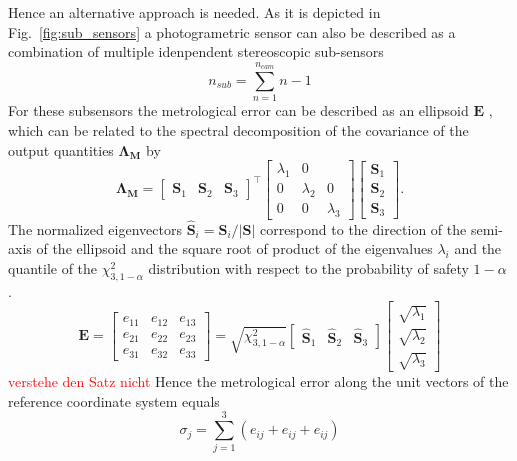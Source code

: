 \documentclass[5p,times,procedia]{elsarticle}
\begin{document}
Hence an alternative approach is needed. As it is depicted in  Fig.~\ref{fig:sub_sensors} a photogrametric sensor can also be described as a combination of multiple idenpendent stereoscopic sub-sensors
\begin{equation}
	\label{eqn:CovarianceMatrix}
	n_{sub} = \sum_{n=1}^{n_{cam}}n-1
\end{equation}
For these subsensors the metrological error can be described as an ellipsoid $\mathbf{E}$ \cite{Luhmann2003}, which can be related to the spectral decomposition of the covariance of the output quantities $\mathbf{\Lambda_{M}}$ by
\begin{equation}
	\mathbf{\Lambda_{M}} =
	\begin{bmatrix}
		\mathbf{S}_1^{} & \mathbf{S}_2^{} & \mathbf{S}_3^{}
	\end{bmatrix}^{\top}
	\begin{bmatrix}
		\lambda_1^{} & 0 \\
		0 & \lambda_2^{} &  0 \\
		0 & 0 &  \lambda_3^{}
	\end{bmatrix}
	\begin{bmatrix}
		\mathbf{S}_1^{} \\
		\mathbf{S}_2^{} \\
		\mathbf{S}_3^{}
	\end{bmatrix}.
\end{equation}
The normalized eigenvectors $\mathbf{\hat{S}}_i = \mathbf{S}_i / |\mathbf{S}|$ correspond to the direction of the semi-axis of the ellipsoid and the square root of product of the eigenvalues $\lambda_i$ and the quantile of the $\chi^2_{3,1-\alpha} $ distribution with respect to the probability of safety $1-\alpha$ \cite{Pelzer1995}.
\begin{equation}
	\mathbf{E} =
	\begin{bmatrix}
		e_{11}^{} & e_{12}^{} & e_{13}^{} \\
		e_{21}^{} & e_{22}^{} & e_{23}^{} \\
		e_{31}^{} & e_{32}^{} & e_{33}^{}
	\end{bmatrix}
	=
	\sqrt{ \chi^2_{3,1-\alpha}}
	\begin{bmatrix}
		\mathbf{\hat{S}}_1^{} & \mathbf{\hat{S}}_2^{} & \mathbf{\hat{S}}_3^{}
	\end{bmatrix}
	\begin{bmatrix}
		\sqrt{\lambda_1^{}} \\
		\sqrt{\lambda_2^{}} \\
		\sqrt{\lambda_3^{}}
	\end{bmatrix}
\end{equation}
\textcolor{red}{verstehe den Satz nicht}
Hence the metrological error along the unit vectors of the reference coordinate system equals
\begin{equation}
	\sigma_j = \sum_{j=1}^{3} \left( e_{ij} + e_{ij} + e_{ij}\right)
\end{equation}
\end{document}
